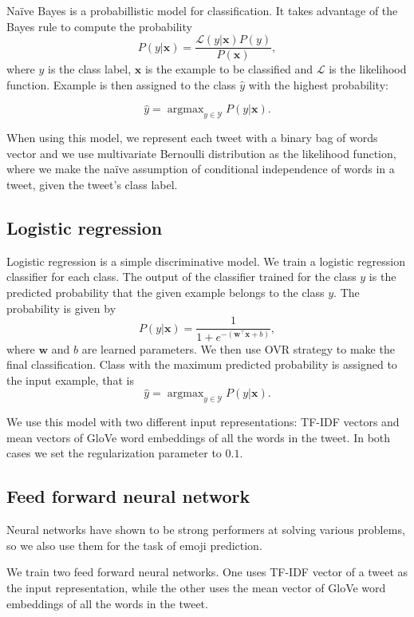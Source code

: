 \documentclass[10pt, a4paper]{article}
\DeclareMathOperator*{\argmax}{argmax}
\begin{document}
Na\"{i}ve Bayes \citep{manning2008introduction} is a probabillistic model for 
classification. It takes advantage of the Bayes rule to compute the probability 
$$P(y|\mathbf{x}) = \frac{\mathcal{L}(y|\mathbf{x}) P(y)}{P(\mathbf{x})},$$
where $y$ is the class label, $\mathbf{x}$ is the example to be classified and 
$\mathcal{L}$ is the likelihood function. Example is then assigned to the class 
$\hat{y}$ with the highest probability:

$$\hat{y} = \argmax_{y \in \mathcal{Y}} P(y|\mathbf{x}).$$

When using this model, we represent each tweet with a binary bag of words vector
and we use multivariate Bernoulli distribution as the likelihood function, where
we make the na\"{i}ve assumption of conditional independence of words in a 
tweet, given the tweet's class label.

\subsection{Logistic regression}

Logistic regression \citep{murphy2012machine} is a simple discriminative model.
We train a logistic regression classifier for each class. The output of the 
classifier trained for the class $y$ is the predicted probability that the given
example belongs to the class $y$. The probability is given by
$$P(y|\mathbf{x}) = \frac{1}{1 + e^{-(\mathbf{w}^\top \mathbf{x} + b)}},$$
where $\mathbf{w}$ and $b$ are learned parameters. We then use OVR strategy 
\citep{bishop2006pattern} to make the final classification. Class with the 
maximum predicted probability is assigned to the input example, that is 
$$\hat{y} = \argmax_{y \in \mathcal{Y}} P(y|\mathbf{x}).$$

We use this model with two different input representations: TF-IDF vectors and 
mean vectors of GloVe word embeddings of all the words in the tweet. In both 
cases we set the regularization parameter to $0.1$.

\subsection{Feed forward neural network}

Neural networks have shown to be strong performers at solving various problems,
so we also use them for the task of emoji prediction. 

We train two feed forward neural networks. One uses TF-IDF vector of a tweet as 
the input representation, while the other uses the mean vector of GloVe word 
embeddings of all the words in the tweet.
\end{document}
